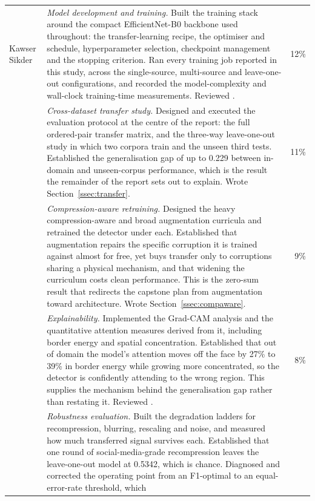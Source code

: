 \documentclass[journal,onecolumn]{IEEEtran}
\begin{document}
{\begin{longtable}{p{30mm}p{88mm}r}
Kawser Sikder &
\emph{Model development and training.} Built the training stack around the
compact EfficientNet-B0 backbone used throughout: the transfer-learning recipe,
the optimiser and schedule, hyperparameter selection, checkpoint management and
the stopping criterion. Ran every training job reported in this study, across the
single-source, multi-source and leave-one-out configurations, and recorded the
model-complexity and wall-clock training-time measurements. Reviewed
\cite{tan2019efficientnet}. & 12\% \\
\addlinespace
&
\emph{Cross-dataset transfer study.} Designed and executed the evaluation
protocol at the centre of the report: the full ordered-pair transfer matrix, and
the three-way leave-one-out study in which two corpora train and the unseen third
tests. Established the generalisation gap of up to 0.229 between in-domain and
unseen-corpus performance, which is the result the remainder of the report sets
out to explain. Wrote Section~\ref{ssec:transfer}. & 11\% \\
\addlinespace
&
\emph{Compression-aware retraining.} Designed the heavy compression-aware and
broad augmentation curricula and retrained the detector under each. Established
that augmentation repairs the specific corruption it is trained against almost
for free, yet buys transfer only to corruptions sharing a physical mechanism, and
that widening the curriculum costs clean performance. This is the zero-sum result
that redirects the capstone plan from augmentation toward architecture. Wrote
Section~\ref{ssec:compaware}. & 9\% \\
\addlinespace
&
\emph{Explainability.} Implemented the Grad-CAM analysis and the quantitative
attention measures derived from it, including border energy and spatial
concentration. Established that out of domain the model's attention moves off the
face by 27\% to 39\% in border energy while growing more concentrated, so the
detector is confidently attending to the wrong region. This supplies the
mechanism behind the generalisation gap rather than restating it. Reviewed
\cite{selvaraju2017gradcam}. & 8\% \\
\addlinespace
&
\emph{Robustness evaluation.} Built the degradation ladders for recompression,
blurring, rescaling and noise, and measured how much transferred signal survives
each. Established that one round of social-media-grade recompression leaves the
leave-one-out model at 0.5342, which is chance. Diagnosed and corrected the
operating point from an F1-optimal to an equal-error-rate threshold, which

\end{longtable}}
\end{document}
